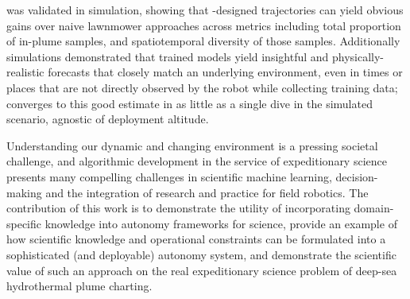 \PHORTEX was validated in simulation, showing that \PHORTEX-designed trajectories can yield obvious gains over naive lawnmower approaches across metrics including total proportion of in-plume samples, and spatiotemporal diversity of those samples. Additionally simulations demonstrated that trained \PHUMES models yield insightful and physically-realistic forecasts that closely match an underlying environment, even in times or places that are not directly observed by the robot while collecting training data; \PHUMES converges to this good estimate in as little as a single dive in the simulated scenario, agnostic of deployment altitude.

Understanding our dynamic and changing environment is a pressing societal challenge, and algorithmic development in the service of expeditionary science presents many compelling challenges in scientific machine learning, decision-making and the integration of research and practice for field robotics. The contribution of this work is to demonstrate the utility of incorporating domain-specific knowledge into autonomy frameworks for science, provide an example of how scientific knowledge and operational constraints can be formulated into a sophisticated (and deployable) autonomy system, and demonstrate the scientific value of such an approach on the real expeditionary science problem of deep-sea hydrothermal plume charting.
